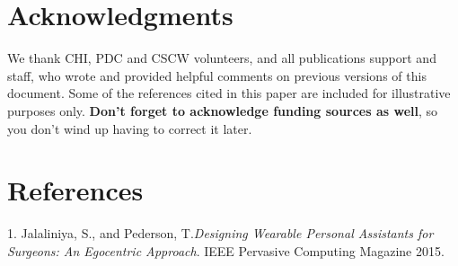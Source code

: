 \documentclass{sigchi}
\begin{document}
\section{Acknowledgments}
We thank CHI, PDC and CSCW volunteers, and all publications support
and staff, who wrote and provided helpful comments on previous
versions of this document.  Some of the references cited in this paper
are included for illustrative purposes only.  \textbf{Don't forget
to acknowledge funding sources as well}, so you don't wind up
having to correct it later.

\section{References}
1. Jalaliniya, S., and Pederson, T.\textit{Designing Wearable Personal Assistants for Surgeons: An Egocentric Approach}. IEEE Pervasive Computing Magazine 2015.


%
%
%
%
%
\balance



\end{document}
